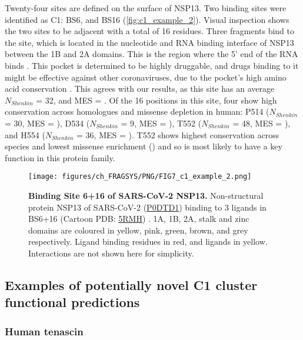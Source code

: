 Twenty-four sites are defined on the surface of NSP13. Two binding sites were identified as C1: BS6, and BS16 (\autoref{fig:c1_example_2}). Visual inspection shows the two sites to be adjacent with a total of 16 residues. Three fragments bind to the site, which is located in the nucleotide and RNA binding interface of NSP13 between the 1B and 2A domains. This is the region where the 5’ end of the RNA binds \cite{YAN_2020_SARSCOV2}. This pocket is determined to be highly druggable, and drugs binding to it might be effective against other coronaviruses, due to the pocket’s high amino acid conservation \cite{NEWMAN_2021_SARSCOV2}. This agrees with our results, as this site has an average $N_{Shenkin}$ = 32, and MES = . Of the 16 positions in this site, four show high conservation across homologues and missense depletion in human: P514 ($N_{Shenkin}$ = 30, MES = ), D534 ($N_{Shenkin}$ = 9, MES = ), T552 ($N_{Shenkin}$ = 48, MES = ), and H554 ($N_{Shenkin}$ = 36, MES = ). T552 shows highest conservation across species and lowest missense enrichment () and so is most likely to have a key function in this protein family.

\begin{figure}[htb!]
    \centering
    \texttt{[image: figures/ch\_FRAGSYS/PNG/FIG7\_c1\_example\_2.png]}
    \caption[Binding Site 6+16 of SARS-CoV-2 NSP13]{\textbf{Binding Site 6+16 of SARS-CoV-2 NSP13.} Non-structural protein NSP13 of SARS-CoV-2 (\href{https://www.uniprot.org/uniprotkb/P0DTD1/entry}{P0DTD1}) binding to 3 ligands in BS6+16 (Cartoon PDB: \href{https://www.ebi.ac.uk/pdbe/entry/pdb/5RMH}{5RMH}) \cite{NEWMAN_2021_SARSCOV2}. 1A, 1B, 2A, stalk and zinc domains are coloured in yellow, pink, green, brown, and grey respectively. Ligand binding residues in red, and ligands in yellow. Interactions are not shown here for simplicity.}
    \label{fig:c1_example_2}
\end{figure}

\subsection{Examples of potentially novel C1 cluster functional predictions}

\subsubsection{Human tenascin}

